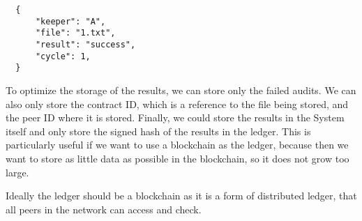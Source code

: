 \begin{verbatim}
  {
      "keeper": "A",
      "file": "1.txt",
      "result": "success",
      "cycle": 1,
  }
\end{verbatim}

To optimize the storage of the results, we can store only the failed audits.
We can also only store the contract ID, which is a reference to the file being stored, and the peer ID
where it is stored.
Finally, we could store the results in the System itself and only store the signed hash of the results in the ledger.
This is particularly useful if we want to use a blockchain as the ledger, because then we want to
store as little data as possible in the blockchain, so it does not grow too large.

Ideally the ledger should be a blockchain as it is a form of distributed ledger,
that all peers in the network can access and check.







